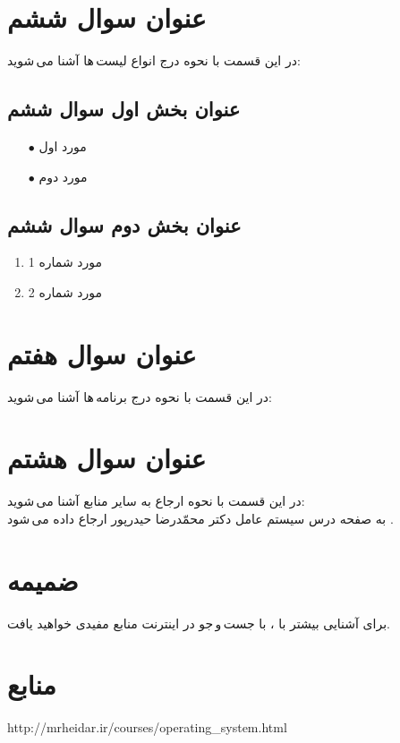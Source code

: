 \documentclass{article}
\begin{document}
\section{عنوان سوال ششم}
در این قسمت با نحوه درج انواع لیست\,ها آشنا می\,شوید:
\subsection{عنوان بخش اول سوال ششم}
\begin{itemize}
    \item [$\bullet$] مورد اول
    \item [$\bullet$] مورد دوم
\end{itemize}
\subsection{عنوان بخش دوم سوال ششم}
\begin{enumerate}
    \item مورد شماره 1
    \item مورد شماره 2
\end{enumerate}

\section{عنوان سوال هفتم}
در این قسمت با نحوه درج برنامه\,ها آشنا می\,شوید:
\lr{}

\section{عنوان سوال هشتم}
در این قسمت با نحوه ارجاع به سایر منابع آشنا می\,شوید:\\
\indent
به صفحه درس سیستم عامل دکتر محمّدرضا حیدرپور ارجاع داده می\,شود \cite{b1}.

\section{ضمیمه}
برای آشنایی بیشتر با \lr{\LaTeX}، با جست\,و\,جو در اینترنت منابع مفیدی خواهید یافت.


\section*{منابع}
\renewcommand{\section}[2]{}%
\begin{thebibliography}{99} %


\begin{LTRitems}

\resetlatinfont

 http://mrheidar.ir/courses/operating\_system.html
\end{LTRitems}

\end{thebibliography}
\end{document}
